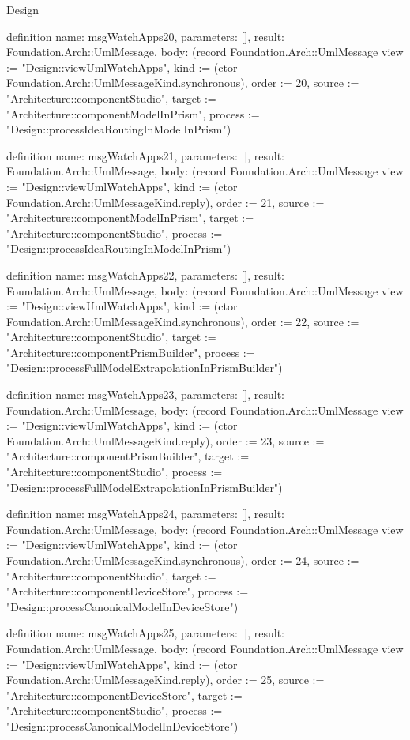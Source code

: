 \begin{lexlean}{Design}
\begin{semanticmodule}
definition{
  name: msgWatchApps20,
  parameters: [],
  result: Foundation.Arch::UmlMessage,
  body: (record Foundation.Arch::UmlMessage {view := "Design::viewUmlWatchApps", kind := (ctor Foundation.Arch::UmlMessageKind.synchronous), order := 20, source := "Architecture::componentStudio", target := "Architecture::componentModelInPrism", process := "Design::processIdeaRoutingInModelInPrism"})
}

definition{
  name: msgWatchApps21,
  parameters: [],
  result: Foundation.Arch::UmlMessage,
  body: (record Foundation.Arch::UmlMessage {view := "Design::viewUmlWatchApps", kind := (ctor Foundation.Arch::UmlMessageKind.reply), order := 21, source := "Architecture::componentModelInPrism", target := "Architecture::componentStudio", process := "Design::processIdeaRoutingInModelInPrism"})
}

definition{
  name: msgWatchApps22,
  parameters: [],
  result: Foundation.Arch::UmlMessage,
  body: (record Foundation.Arch::UmlMessage {view := "Design::viewUmlWatchApps", kind := (ctor Foundation.Arch::UmlMessageKind.synchronous), order := 22, source := "Architecture::componentStudio", target := "Architecture::componentPrismBuilder", process := "Design::processFullModelExtrapolationInPrismBuilder"})
}

definition{
  name: msgWatchApps23,
  parameters: [],
  result: Foundation.Arch::UmlMessage,
  body: (record Foundation.Arch::UmlMessage {view := "Design::viewUmlWatchApps", kind := (ctor Foundation.Arch::UmlMessageKind.reply), order := 23, source := "Architecture::componentPrismBuilder", target := "Architecture::componentStudio", process := "Design::processFullModelExtrapolationInPrismBuilder"})
}

definition{
  name: msgWatchApps24,
  parameters: [],
  result: Foundation.Arch::UmlMessage,
  body: (record Foundation.Arch::UmlMessage {view := "Design::viewUmlWatchApps", kind := (ctor Foundation.Arch::UmlMessageKind.synchronous), order := 24, source := "Architecture::componentStudio", target := "Architecture::componentDeviceStore", process := "Design::processCanonicalModelInDeviceStore"})
}

definition{
  name: msgWatchApps25,
  parameters: [],
  result: Foundation.Arch::UmlMessage,
  body: (record Foundation.Arch::UmlMessage {view := "Design::viewUmlWatchApps", kind := (ctor Foundation.Arch::UmlMessageKind.reply), order := 25, source := "Architecture::componentDeviceStore", target := "Architecture::componentStudio", process := "Design::processCanonicalModelInDeviceStore"})
}


\end{semanticmodule}
\end{lexlean}
